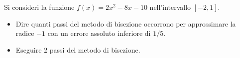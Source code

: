 Si consideri la funzione $f(x)=2x^2-8x-10$ nell'intervallo
$[-2,1]$.
\begin{itemize}
\item  Dire quanti passi del metodo di bisezione occorrono per
approssimare la radice $-1$ con un errore assoluto inferiore di
$1/5$.
\item Eseguire $2$ passi del metodo di bisezione.\\
\end{itemize}
